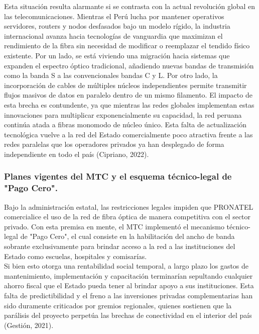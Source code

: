 Esta situación resulta alarmante si se contrasta con la actual revolución global en las telecomunicaciones. 
Mientras el Perú lucha por mantener operativos servidores, routers y nodos desfasados bajo un modelo rígido, la industria internacional 
avanza hacia tecnologías de vanguardia que maximizan el rendimiento de la fibra sin necesidad de modificar o reemplazar el tendido físico 
existente. Por un lado, se está viviendo una migración hacia sistemas que expanden el espectro óptico tradicional, añadiendo nuevas bandas 
de transmisión como la banda S a las convencionales bandas C y L. Por otro lado, la incorporación de cables de múltiples núcleos independientes 
permite transmitir flujos masivos de datos en paralelo dentro de un mismo filamento. El impacto de esta brecha es contundente, 
ya que mientras las redes globales implementan estas innovaciones para multiplicar exponencialmente su capacidad, la red peruana continúa atada a 
fibras monomodo de núcleo único. Esta falta de actualización tecnológica vuelve a la red del Estado 
comercialmente poco atractiva frente a las redes paralelas que los operadores privados ya han desplegado de forma independiente en todo el país 
(Cipriano, 2022).

\subsubsection{Planes vigentes del MTC y el esquema técnico-legal de "Pago Cero".}

Bajo la administración estatal, las restricciones legales impiden que PRONATEL comercialice el uso de la red de fibra
óptica de manera competitiva con el sector privado. Con esta premisa en mente, el MTC implementó el mecanismo técnico-legal de "Pago Cero", 
el cual consiste en la habilitación del ancho de banda sobrante exclusivamente para brindar acceso a la red a las instituciones del Estado como escuelas, hospitales y comisarías.\\

Si bien esto otorga una rentabilidad social temporal, a largo plazo los gastos de mantenimiento, implementación y 
capacitación terminarían sepultando cualquier ahorro fiscal que el Estado pueda tener al brindar apoyo a sus instituciones. Esta falta de predictibilidad y el freno a las 
inversiones privadas complementarias han sido duramente criticados por gremios regionales, quienes sostienen que la parálisis del proyecto perpetúa las brechas de conectividad en el interior del país (Gestión, 2021). 


